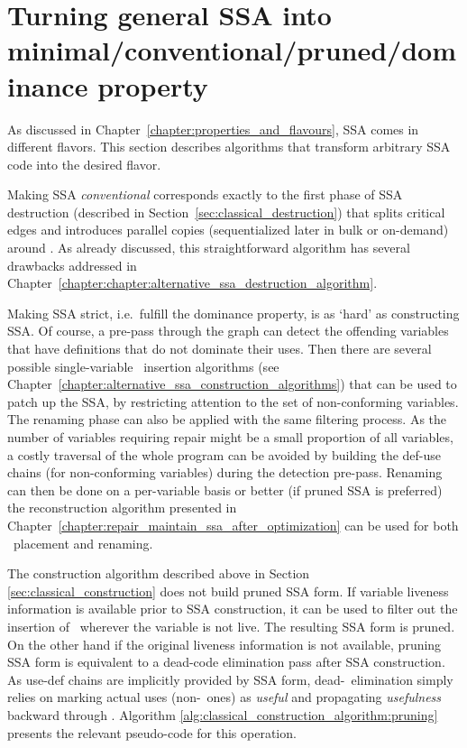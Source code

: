 \section{Turning general SSA into minimal/conventional/pruned/dominance property}
\label{section:classical_construction_algorithm:turning}
As discussed in Chapter~\ref{chapter:properties_and_flavours},
SSA comes in different flavors. 
This section describes algorithms that transform
arbitrary SSA code
into the desired flavor.

Making SSA \textit{conventional} corresponds exactly to the first phase of SSA destruction (described in Section~\ref{sec:classical_destruction}) that splits critical edges and introduces parallel copies (sequentialized later in bulk or on-demand) around \phiops. As already discussed, this straightforward algorithm has several drawbacks addressed in Chapter~\ref{chapter:chapter:alternative_ssa_destruction_algorithm}.

Making SSA strict, i.e.\ fulfill the dominance property, is as `hard' as constructing SSA. Of course, a pre-pass through the graph can detect the offending variables that have definitions that do not dominate their uses. Then there are several possible single-variable \phiop\ insertion algorithms (see Chapter~\ref{chapter:alternative_ssa_construction_algorithms}) that can be used to patch up the SSA, by restricting attention to the set of non-conforming variables. The renaming phase can also be applied with the same filtering process. As the number of variables requiring repair might be a small proportion of all variables, a costly traversal of the whole program can be avoided by building the def-use chains (for non-conforming variables) during the detection pre-pass. Renaming can then be done on a per-variable basis or better (if pruned SSA is preferred) the reconstruction algorithm presented in Chapter~\ref{chapter:repair_maintain_ssa_after_optimization} can be used for both \phiops\ placement and renaming.

The construction algorithm described above in
Section \ref{sec:classical_construction} does not
build pruned SSA form. 
If variable liveness information is available prior
to SSA construction, it can be used to filter out the 
insertion of \phiops\ wherever the variable is not live.
The resulting SSA form is pruned.
On the other hand
if the original liveness information is not available, 
pruning SSA form is equivalent to a dead-code elimination pass
after SSA construction.
As use-def chains are implicitly provided by SSA form, 
dead-\phiop\ elimination simply relies on marking actual uses 
(non-\phiop\ ones) as \emph{useful} and propagating 
\emph{usefulness} backward through \phiops.
Algorithm \ref{alg:classical_construction_algorithm:pruning} 
presents the relevant pseudo-code for this operation.


